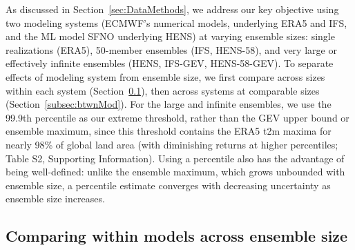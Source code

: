 \documentclass[draft]{agujournal2019}
\begin{document}
As discussed in Section~\ref{sec:DataMethods}, we address our key objective %
using two modeling systems (ECMWF's numerical models, underlying ERA5 and IFS, and the ML model SFNO underlying HENS) at varying ensemble sizes: single realizations (ERA5), 50-member ensembles (IFS, HENS-58), and very large or effectively infinite ensembles (HENS, IFS-GEV, HENS-58-GEV). To separate effects of modeling system from ensemble size, we first compare across sizes within each system (Section~\ref{subsec:withinMod}), then across systems at comparable sizes (Section~\ref{subsec:btwnMod}). For the large and infinite ensembles, we use the 99.9th percentile as our extreme threshold, rather than the GEV upper bound or ensemble maximum, since this threshold contains the ERA5 t2m maxima for nearly 98\% of global land area (with diminishing returns at higher percentiles; Table S2, Supporting Information). Using a percentile also has the advantage of being well-defined: unlike the ensemble maximum, which grows unbounded with ensemble size, a percentile estimate converges with decreasing uncertainty as ensemble size increases.



\subsection{Comparing within models across ensemble size} \label{subsec:withinMod}

\end{document}
